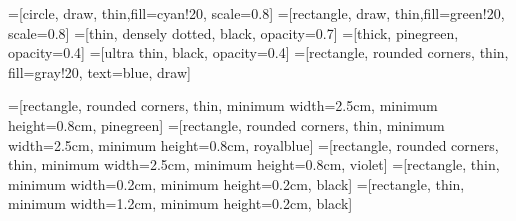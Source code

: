 \setlength\PreviewBorder{7pt}
=[circle, draw, thin,fill=cyan!20, scale=0.8]
=[rectangle, draw, thin,fill=green!20, scale=0.8]
=[thin, densely dotted, black, opacity=0.7]
=[thick, pinegreen, opacity=0.4]
=[ultra thin, black, opacity=0.4]
=[rectangle, rounded corners, thin, 
                       fill=gray!20, text=blue, draw]
                        
=[rectangle, rounded corners, thin,
                           minimum width=2.5cm, minimum height=0.8cm,
                           pinegreen]
=[rectangle, rounded corners, thin,
                          minimum width=2.5cm, minimum height=0.8cm,
                          royalblue]
=[rectangle, rounded corners, thin,
                          minimum width=2.5cm, minimum height=0.8cm,
                          violet]
=[rectangle, thin,
                          minimum width=0.2cm, minimum height=0.2cm,
                          black]
=[rectangle, thin,
                          minimum width=1.2cm, minimum height=0.2cm,
                          black]

